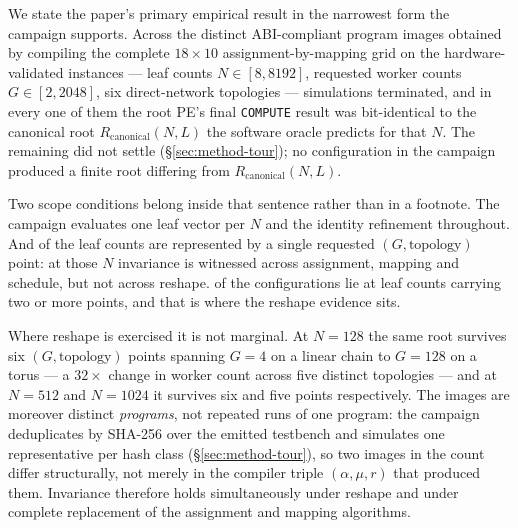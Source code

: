 \documentclass[journal,10pt]{IEEEtran}
\theoremstyle{plain}
\theoremstyle{definition}
\theoremstyle{remark}
\newcommand{\Rcan}{\ensuremath{R_{\mathrm{canonical}}}}
\newcommand{\asgn}{\ensuremath{\alpha}}
\newcommand{\map}{\ensuremath{\mu}}
\begin{document}
We state the paper's primary empirical result in the narrowest form the
campaign supports. Across the \InvAttempted{} distinct ABI-compliant program
images obtained by compiling the complete $18\times10$
assignment-by-mapping grid on the \TournNInst{} hardware-validated instances
--- \InvLeafCounts{} leaf counts $N \in [8,8192]$, requested worker counts
$G \in [2,2048]$, six direct-network topologies --- \WallTBs{} simulations
terminated, and in every one of them the root PE's final \texttt{COMPUTE}
result was bit-identical to the canonical root $\Rcan(N,L)$ the software
oracle predicts for that $N$. The remaining \InvNonSettling{} did not settle
(\S\ref{sec:method-tour}); no configuration in the campaign produced a
finite root differing from $\Rcan(N,L)$.

Two scope conditions belong inside that sentence rather than in a footnote.
The campaign evaluates one leaf vector per $N$ and the identity refinement
throughout. And \InvSingletonRows{} of the \InvLeafCounts{} leaf counts are
represented by a single requested $(G,\text{topology})$ point: at those $N$
invariance is witnessed across assignment, mapping and schedule, but not
across reshape. \InvMultiPoint{} of the \WallTBs{} configurations lie at
leaf counts carrying two or more points, and that is where the reshape
evidence sits.

Where reshape is exercised it is not marginal. At $N{=}128$ the same root
survives six $(G,\text{topology})$ points spanning $G{=}4$ on a linear chain
to $G{=}128$ on a torus --- a $32\times$ change in worker count across five
distinct topologies --- and at $N{=}512$ and $N{=}1024$ it survives six and
five points respectively. The \InvAttempted{} images are moreover distinct
\emph{programs}, not repeated runs of one program: the campaign
deduplicates by SHA-256 over the emitted testbench and simulates one
representative per hash class (\S\ref{sec:method-tour}), so two images in
the count differ structurally, not merely in the compiler triple
$(\asgn, \map, r)$ that produced them. Invariance therefore holds
simultaneously under reshape and under complete replacement of the
assignment and mapping algorithms.
\end{document}
